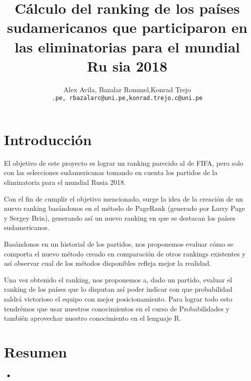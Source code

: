 \documentclass[twocolumn]{article}
\begin{document}
 

\title{
Cálculo del ranking de los países sudamericanos que participaron en las eliminatorias para el mundial Ru	sia 2018 
}
\date{}
\author{Alex Avila, Bazalar Rommel,Konrad Trejo\\
\small{\texttt{\@aavilas@uni.pe, rbazalarc@uni.pe,konrad.trejo.c@uni.pe}}}
\maketitle



\section{Introducción}

	El objetivo de este proyecto es lograr un ranking parecido al de FIFA, pero solo con las selecciones sudamericanas tomando en cuenta los partidos de la eliminatoria para el mundial Rusia 2018.

	Con el fin de cumplir el objetivo mencionado, surge la idea de la creación de un nuevo ranking basándonos en el método de PageRank (generado por Larry Page y Sergey Brin), generando así un nuevo ranking en que se destacan los países sudamericanos.

	Basándonos en un historial de los partidos, nos proponemos evaluar cómo se comporta el nuevo método creado en comparación de otros rankings existentes y así observar cual de los métodos disponibles refleja mejor la realidad.

	Una vez obtenido el ranking, nos proponemos a, dado un partido, evaluar el ranking de los países que lo disputan  así poder indicar con que probabilidad saldrá victorioso el equipo con mejor posicionamiento. Para lograr todo esto tendrémos que usar nuestros conocimientos en el curso de Probabilidades y también aprovechar nuestro conocimiento en el lenguaje R.


\section{Resumen}
\begin{itemize}
\item 
\end{itemize}

\end{document}
